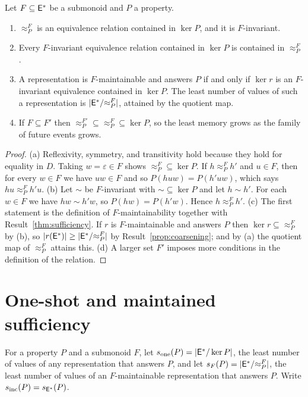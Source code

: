 \begin{newresult}\label{thm:nerode-family}
Let $F\subseteq\mathsf{E}^{*}$ be a submonoid and $P$ a property.
\begin{enumerate}[nosep,label=(\alph*)]
  \item $\approx^{F}_P$ is an equivalence relation contained in $\ker P$, and it is $F$-invariant.
  \item Every $F$-invariant equivalence relation contained in $\ker P$ is contained in $\approx^{F}_P$.
  \item A representation is $F$-maintainable and answers $P$ if and only if $\ker r$ is an $F$-invariant equivalence contained in $\ker P$. The least number of values of such a representation is $|\mathsf{E}^{*}/{\approx^{F}_P}|$, attained by the quotient map.
  \item If $F\subseteq F'$ then ${\approx^{F'}_P}\subseteq{\approx^{F}_P}\subseteq\ker P$, so the least memory grows as the family of future events grows.
\end{enumerate}
\end{newresult}
\begin{proof}
(a) Reflexivity, symmetry, and transitivity hold because they hold for equality in $D$. Taking $w=\varepsilon\in F$ shows ${\approx^{F}_P}\subseteq\ker P$. If $h\approx^{F}_P h'$ and $u\in F$, then for every $w\in F$ we have $uw\in F$ and so $P(huw)=P(h'uw)$, which says $hu\approx^{F}_Ph'u$. (b) Let $\sim$ be $F$-invariant with ${\sim}\subseteq\ker P$ and let $h\sim h'$. For each $w\in F$ we have $hw\sim h'w$, so $P(hw)=P(h'w)$. Hence $h\approx^{F}_Ph'$. (c) The first statement is the definition of $F$-maintainability together with Result~\ref{thm:sufficiency}. If $r$ is $F$-maintainable and answers $P$ then $\ker r\subseteq{\approx^{F}_P}$ by (b), so $|r(\mathsf{E}^{*})|\ge|\mathsf{E}^{*}/{\approx^{F}_P}|$ by Result~\ref{prop:coarsening}; and by (a) the quotient map of $\approx^{F}_P$ attains this. (d) A larger set $F'$ imposes more conditions in the definition of the relation.
\end{proof}

\section{One-shot and maintained sufficiency}

\begin{definition}\label{def:sizes}
For a property $P$ and a submonoid $F$, let $s_{\mathrm{one}}(P)=|\mathsf{E}^{*}/\ker P|$, the least number of values of any representation that answers $P$, and let $s_F(P)=|\mathsf{E}^{*}/{\approx^{F}_P}|$, the least number of values of an $F$-maintainable representation that answers $P$. Write $s_{\mathrm{inc}}(P)=s_{\mathsf{E}^{*}}(P)$.
\end{definition}

